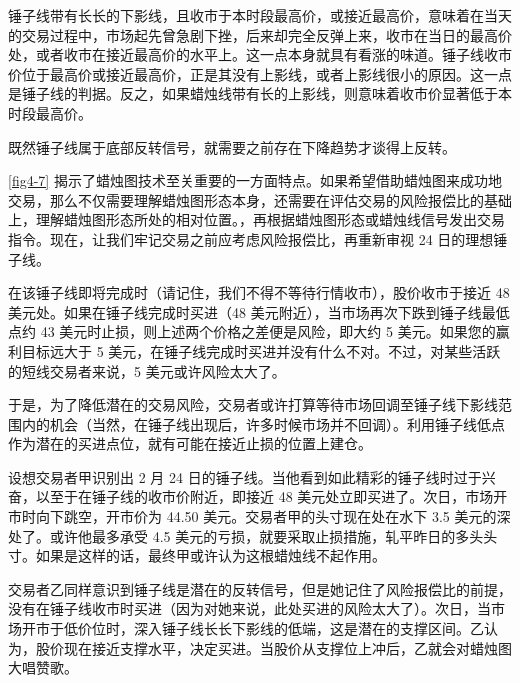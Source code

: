 锤子线带有长长的下影线，且收市于本时段最高价，或接近最高价，意味着在当天的交易过程中，市场起先曾急剧下挫，后来却完全反弹上来，收市在当日的最高价处，或者收市在接近最高价的水平上。这一点本身就具有看涨的味道。锤子线收市价位于最高价或接近最高价，正是其没有上影线，或者上影线很小的原因。这一点是锤子线的判据。反之，如果蜡烛线带有长的上影线，则意味着收市价显著低于本时段最高价。

既然锤子线属于底部反转信号，就需要之前存在下降趋势才谈得上反转。


\autoref{fig4-7} 揭示了蜡烛图技术至关重要的一方面特点。如果希望借助蜡烛图来成功地交易，那么不仅需要理解蜡烛图形态本身，还需要在评估交易的风险报偿比的基础上，理解蜡烛图形态所处的相对位置。，再根据蜡烛图形态或蜡烛线信号发出交易指令。现在，让我们牢记交易之前应考虑风险报偿比，再重新审视 24 日的理想锤子线。

在该锤子线即将完成时（请记住，我们不得不等待行情收市），股价收市于接近 48 美元处。如果在锤子线完成时买进（48 美元附近），当市场再次下跌到锤子线最低点约 43 美元时止损，则上述两个价格之差便是风险，即大约 5 美元。如果您的赢利目标远大于 5 美元，在锤子线完成时买进并没有什么不对。不过，对某些活跃的短线交易者来说，5 美元或许风险太大了。

于是，为了降低潜在的交易风险，交易者或许打算等待市场回调至锤子线下影线范围内的机会（当然，在锤子线出现后，许多时候市场并不回调）。利用锤子线低点作为潜在的买进点位，就有可能在接近止损的位置上建仓。

设想交易者甲识别出 2 月 24 日的锤子线。当他看到如此精彩的锤子线时过于兴奋，以至于在锤子线的收市价附近，即接近 48 美元处立即买进了。次日，市场开市时向下跳空，开市价为 44.50 美元。交易者甲的头寸现在处在水下 3.5 美元的深处了。或许他最多承受 4.5 美元的亏损，就要采取止损措施，轧平昨日的多头头寸。如果是这样的话，最终甲或许认为这根蜡烛线不起作用。

交易者乙同样意识到锤子线是潜在的反转信号，但是她记住了风险报偿比的前提，没有在锤子线收市时买进（因为对她来说，此处买进的风险太大了）。次日，当市场开市于低价位时，深入锤子线长长下影线的低端，这是潜在的支撑区间。乙认为，股价现在接近支撑水平，决定买进。当股价从支撑位上冲后，乙就会对蜡烛图大唱赞歌。


